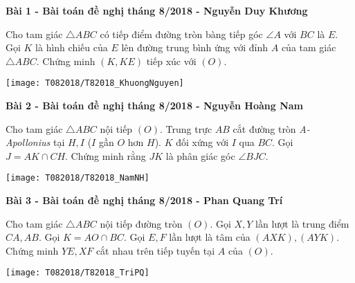 \begin{framed}\noindent
	
	\textbf{Bài 1 - Bài toán đề nghị tháng 8/2018 - Nguyễn Duy Khương}
	
	Cho tam giác $\triangle ABC$ có tiếp điểm đường tròn bàng tiếp góc $\angle A$ với $BC$ là $E$. Gọi $K$ là hình chiếu của $E$ lên đường trung bình ứng với đỉnh $A$ của tam giác $\triangle ABC$. Chứng minh $(K, KE)$ tiếp xúc với $(O)$.

	
\end{framed}

\begin{center}
	\texttt{[image: T082018/T82018\_KhuongNguyen]}
	
\end{center}

\begin{framed}\noindent
	
	\textbf{Bài 2 - Bài toán đề nghị tháng 8/2018 - Nguyễn Hoàng Nam}
	
	Cho tam giác $\triangle ABC$ nội tiếp $(O)$. Trung trực $AB$ cắt đường tròn \textit{A-Apollonius} \footnotemark tại $H, I$ ($I$ gần $O$ hơn $H$). $K$ đối xứng với $I$ qua $BC$. Gọi $J = AK \cap CH$. Chứng minh rằng $JK$ là phân giác góc $\angle BJC$.
	
\end{framed}


\begin{center}
	\texttt{[image: T082018/T82018\_NamNH]}
	
\end{center}

\begin{framed}\noindent
	
	\textbf{Bài 3 - Bài toán đề nghị tháng 8/2018 - Phan Quang Trí}
	
	Cho tam giác $\triangle ABC$ nội tiếp đường tròn $(O)$. Gọi $X, Y$ lần lượt là trung điểm $CA, AB$. Gọi $K = AO \cap BC$. Gọi $E, F$ lần lượt là tâm của $(AXK), (AYK)$. Chứng minh $YE, XF$ cắt nhau trên tiếp tuyến tại $A$ của $(O)$.
	
\end{framed}

\begin{center}
	\texttt{[image: T082018/T82018\_TriPQ]}
	
\end{center}